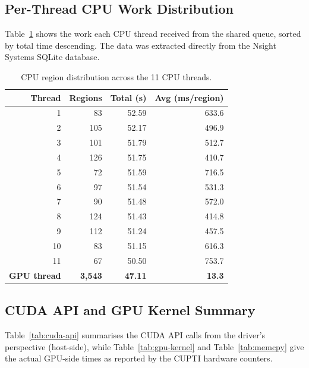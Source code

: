 \documentclass[
	english,
	letterpaper, oneside
]{article}
\begin{document}
\subsection{Per-Thread CPU Work Distribution}

Table~\ref{tab:cpu-threads} shows the work each CPU thread received from
the shared queue, sorted by total time descending. The data was extracted
directly from the Nsight Systems SQLite database.

\begin{table}[H]
    \centering
    \caption{CPU region distribution across the 11 CPU threads.}
    \label{tab:cpu-threads}
    \begin{tabular}{rrrr}
        \hline
        \textbf{Thread} & \textbf{Regions} & \textbf{Total (s)} & \textbf{Avg (ms/region)} \\
        \hline
        1  &  83 & 52.59 & 633.6 \\
        2  & 105 & 52.17 & 496.9 \\
        3  & 101 & 51.79 & 512.7 \\
        4  & 126 & 51.75 & 410.7 \\
        5  &  72 & 51.59 & 716.5 \\
        6  &  97 & 51.54 & 531.3 \\
        7  &  90 & 51.48 & 572.0 \\
        8  & 124 & 51.43 & 414.8 \\
        9  & 112 & 51.24 & 457.5 \\
        10 &  83 & 51.15 & 616.3 \\
        11 &  67 & 50.50 & 753.7 \\
        \hline
        \textbf{GPU thread} & \textbf{3{,}543} & \textbf{47.11} & \textbf{13.3} \\
        \hline
    \end{tabular}
\end{table}

\subsection{CUDA API and GPU Kernel Summary}

Table~\ref{tab:cuda-api} summarises the CUDA API calls from the driver's
perspective (host-side), while Table~\ref{tab:gpu-kernel} and
Table~\ref{tab:memcpy} give the actual GPU-side times as reported by the
CUPTI hardware counters.
\end{document}
